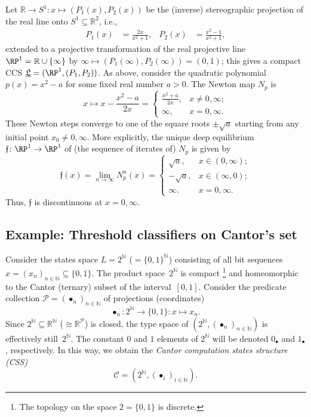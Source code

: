 Let $\mathbb{R}\to S^1: x\mapsto (P_1(x),P_2(x))$ be the (inverse) stereographic projection of the real line onto $S^1\subseteq \mathbb{R}^2$, i.e.,
\begin{align*}
    P_1(x) &= \frac{2x}{x^2+1}, &
    P_2(x) &= \frac{x^2-1}{x^2+1},
\end{align*}
extended to a projective transformation of the real projective line $\RP^1 = \mathbb{R}\cup\{\infty\}$ by $\infty \mapsto (P_1(\infty), P_2(\infty)) = (0, 1)$;
this gives a compact CCS $\underline{\mathfrak{L}} = (\RP^1, (P_1, P_2))$.
As above, consider the quadratic polynomial $p(x)=x^2-a$ for some fixed real number $a>0$.
The Newton map $N_p$ is
\begin{equation*}
    x \mapsto x - \frac{x^2-a}{2x}=
    \begin{cases}
        \frac{x^2+a}{2x}, & x\ne0,\infty;\\
        \infty, & x=0, \infty.
    \end{cases}
\end{equation*}
These Newton steps converge to one of the square roots $\pm\sqrt{a}$ starting from any initial point $x_0\ne0,\infty$.
More explicitly, the unique deep equilibrium $\mathfrak{f}\colon \RP^1\to\RP^1$ of (the sequence of iterates of) $N_p$ is given by
\[
 \mathfrak{f}(x)
 =
 \lim_{n\rightarrow\infty}N_p^n(x)
 =
 \begin{cases}
    \sqrt{a}, & x\in(0,\infty);\\
    -\sqrt{a}, & x\in(\infty,0);\\
    \infty. & x = 0, \infty.
 \end{cases}
 \]
 Thus, $\mathfrak{f}$ is discontinuous at $x = 0, \infty$.

\subsection{Example: Threshold classifiers on Cantor's set}\label{sec:Cantor-classifiers}

Consider the states space $L = 2^\mathbb{N}$ ($= \{0,1\}^{\mathbb{N}}$) consisting of all bit sequences $x = (x_n)_{n\in \mathbb{N}} \subseteq \{0,1\}$.
The product space~$2^{\mathbb{N}}$ is compact%
\footnote{The topology on the space $2 = \{0,1\}$ is discrete.}
and homeomorphic to the Cantor (ternary) subset of the interval~$[0,1]$.
Consider the predicate collection $\mathcal{P} = (\bullet_n)_{n\in\mathbb{N}}$ of projections (coordinates)
\begin{equation*}
    \bullet_n\colon 2^{\mathbb{N}}\to\{0,1\}: x \mapsto x_n.
\end{equation*}
Since $2^{\mathbb{N}} \subseteq \mathbb{R}^{\mathbb{N}}$ ($\cong \mathbb{R}^{\mathcal{P}}$) is closed, the type space of $(2^{\mathbb{N}}, (\bullet_n)_{n\in \mathbb{N}})$ is effectively still~$2^{\mathbb{N}}$.
The constant $0$ and $1$ elements of $2^\mathbb{N}$ will be denoted $0_{\bullet}$ and $1_{\bullet}$, respectively.
In this way, we obtain the \emph{Cantor computation states structure (CSS)}
\begin{equation*}
    \mathcal{C} = (2^{\mathbb{N}},(\bullet_i)_{i\in \mathbb{N}}).
\end{equation*}

